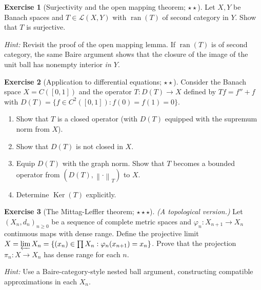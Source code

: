 \documentclass[a4paper,12pt]{book}
\DeclareMathOperator{\Ker}{Ker}
\DeclareMathOperator{\ran}{ran}
\newcommand{\norm}[1]{\left\| #1 \right\|}
\theoremstyle{definition}
\newtheorem{exercise}{Exercise}[chapter]
\theoremstyle{plain}
\theoremstyle{remark}
\begin{document}
\begin{exercise}[Surjectivity and the open mapping theorem; $\star\star$]%
\label{ex:omt-not-surjective}
Let $X, Y$ be Banach spaces and $T \in \mathcal{L}(X,Y)$ with $\ran(T)$ of
second category in $Y$. Show that $T$ is surjective.

\noindent\textit{Hint:} Revisit the proof of the open mapping lemma. If $\ran(T)$
is of second category, the same Baire argument shows that the closure of the image
of the unit ball has nonempty interior \emph{in $Y$}.
\end{exercise}

\begin{exercise}[Application to differential equations; $\star\star$]%
\label{ex:ode-closed-graph}
Consider the Banach space $X = C([0,1])$ and the operator $T \colon D(T) \to X$
defined by $Tf = f'' + f$ with $D(T) = \{f \in C^2([0,1]) : f(0) = f(1) = 0\}$.
\begin{enumerate}[label=(\alph*)]
  \item Show that $T$ is a closed operator (with $D(T)$ equipped with the supremum
    norm from $X$).
  \item Show that $D(T)$ is not closed in $X$.
  \item Equip $D(T)$ with the graph norm. Show that $T$ becomes a bounded operator
    from $(D(T), \norm{\cdot}_T)$ to $X$.
  \item Determine $\Ker(T)$ explicitly.
\end{enumerate}
\end{exercise}

\begin{exercise}[The Mittag-Leffler theorem; $\star\star\star$]%
\label{ex:mittag-leffler}
\emph{(A topological version.)} Let $(X_n, d_n)_{n \geq 0}$ be a sequence of
complete metric spaces and $\varphi_n \colon X_{n+1} \to X_n$ continuous maps
with dense range. Define the projective limit
$X = \varprojlim X_n = \{(x_n) \in \prod X_n : \varphi_n(x_{n+1}) = x_n\}$.
Prove that the projection $\pi_n \colon X \to X_n$ has dense range for each $n$.

\noindent\textit{Hint:} Use a Baire-category-style nested ball argument, constructing
compatible approximations in each $X_n$.
\end{exercise}
\end{document}
